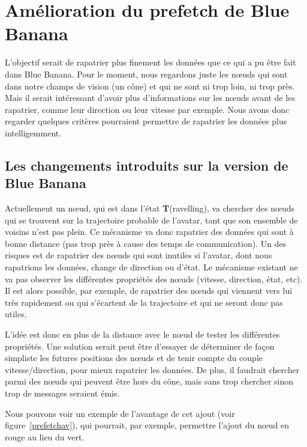 \section{Amélioration du prefetch de Blue Banana}

L'objectif serait de rapatrier plus finement les données que ce qui a pu être fait dans Blue Banana. Pour le moment, nous regardons juste les nœuds qui sont dans notre champs de vision (un cône) et qui ne sont ni trop loin, ni trop près. Mais il serait intéressant d'avoir plus d'informations sur les nœuds avant de les rapatrier, comme leur direction ou leur vitesse par exemple. Nous avons donc regarder quelques critères pourraient permettre de rapatrier les données plus intelligemment.

\subsection{Les changements introduits sur la version de Blue Banana}


\par Actuellement un nœud, qui est dans l'état \textbf{T}(ravelling), va chercher des nœuds qui se trouvent sur la trajectoire probable de l'avatar, tant que son ensemble de voisins n'est pas plein. Ce mécanisme va donc rapatrier des données qui sont à bonne distance (pas trop près à cause des temps de communication). Un des risques est de rapatrier des nœuds qui sont inutiles si l'avatar, dont nous rapatrions les données, change de direction ou d'état. Le mécanisme existant ne va pas observer les différentes propriétés des nœuds (vitesse, direction, état, etc). Il est alors possible, par exemple, de rapatrier des nœuds qui viennent vers lui très rapidement ou qui s'écartent de la trajectoire et qui ne seront donc pas utiles.


\par L'idée est donc en plus de la distance avec le nœud de tester les différentes propriétés. Une solution serait peut être d'essayer de déterminer de façon simpliste les futures positions des nœuds et de tenir compte du couple vitesse/direction, pour mieux rapatrier les données. De plus, il faudrait chercher parmi des nœuds qui peuvent être hors du cône, mais sans trop chercher sinon trop de messages seraient émis.
\par  Nous pouvons voir un exemple de l'avantage de cet ajout (voir figure~\ref{prefetchav}), qui pourrait, par exemple, permettre l'ajout du nœud en rouge au lieu du vert.

